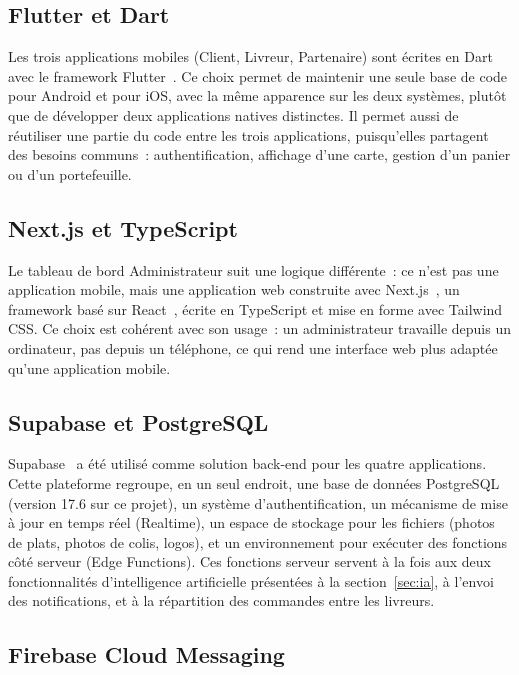 \documentclass[12pt,fleqn,a4paper]{report}
\begin{document}
\begin{justify}
\subsection{Flutter et Dart}

Les trois applications mobiles (Client, Livreur, Partenaire) sont écrites en Dart avec le framework Flutter~\cite{flutter_docs,dart_docs}. Ce choix permet de maintenir une seule base de code pour Android et pour iOS, avec la même apparence sur les deux systèmes, plutôt que de développer deux applications natives distinctes. Il permet aussi de réutiliser une partie du code entre les trois applications, puisqu'elles partagent des besoins communs~: authentification, affichage d'une carte, gestion d'un panier ou d'un portefeuille.

\subsection{Next.js et TypeScript}

Le tableau de bord Administrateur suit une logique différente~: ce n'est pas une application mobile, mais une application web construite avec Next.js~\cite{nextjs_docs}, un framework basé sur React~\cite{react_docs}, écrite en TypeScript et mise en forme avec Tailwind CSS. Ce choix est cohérent avec son usage~: un administrateur travaille depuis un ordinateur, pas depuis un téléphone, ce qui rend une interface web plus adaptée qu'une application mobile.

\subsection{Supabase et PostgreSQL}

Supabase~\cite{supabase_docs} a été utilisé comme solution back-end pour les quatre applications. Cette plateforme regroupe, en un seul endroit, une base de données PostgreSQL~\cite{postgresql_docs} (version 17.6 sur ce projet), un système d'authentification, un mécanisme de mise à jour en temps réel (Realtime), un espace de stockage pour les fichiers (photos de plats, photos de colis, logos), et un environnement pour exécuter des fonctions côté serveur (Edge Functions). Ces fonctions serveur servent à la fois aux deux fonctionnalités d'intelligence artificielle présentées à la section~\ref{sec:ia}, à l'envoi des notifications, et à la répartition des commandes entre les livreurs.

\subsection{Firebase Cloud Messaging}


\end{justify}
\end{document}
